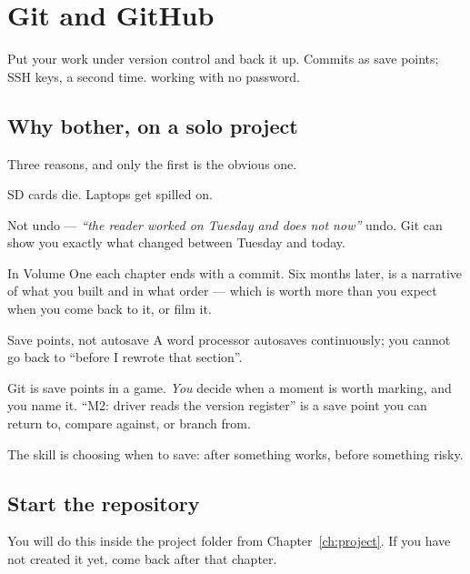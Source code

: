 \chapter{Git and GitHub}
\label{ch:git}

\chapterbrief
  {Put your work under version control and back it up.}
  {Commits as save points; SSH keys, a second time.}
  { working with no password.}

\section{Why bother, on a solo project}

Three reasons, and only the first is the obvious one.

\begin{description}[leftmargin=0pt, style=nextline]
  \item[Backup.] SD cards die. Laptops get spilled on.
  \item[Undo.] Not  undo --- \emph{``the reader worked on Tuesday
        and does not now''} undo. Git can show you exactly what changed between
        Tuesday and today.
  \item[A record of your reasoning.] In Volume One each chapter ends with a
        commit. Six months later,  is a narrative of what you built
        and in what order --- which is worth more than you expect when you come
        back to it, or film it.
\end{description}

\begin{analogy}{Save points, not autosave}
A word processor autosaves continuously; you cannot go back to ``before I
rewrote that section''.

Git is save points in a game. \emph{You} decide when a moment is worth marking,
and you name it. ``M2: driver reads the version register'' is a save point you
can return to, compare against, or branch from.

The skill is choosing when to save: after something works, before something
risky.
\end{analogy}

\section{Start the repository}

You will do this inside the project folder from Chapter~\ref{ch:project}. If you
have not created it yet, come back after that chapter.

